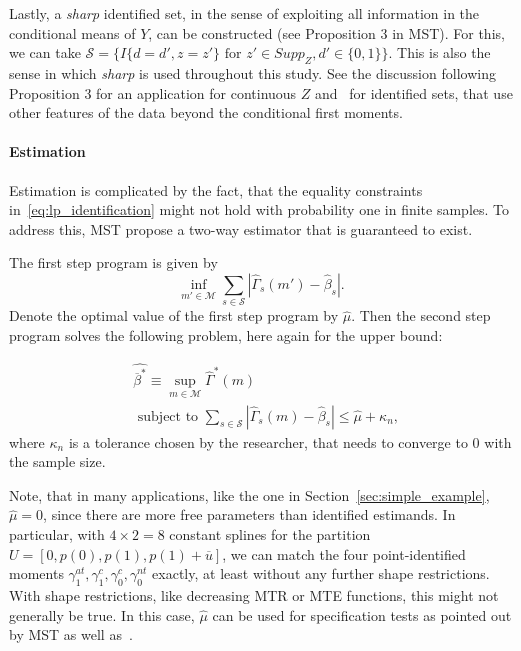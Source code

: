 \documentclass[12pt,a4paper,english]{article} %
\numberwithin{equation}{section}
\theoremstyle{definition}
\theoremstyle{remark}
\theoremstyle{plain}
\begin{document}
Lastly, a \textit{sharp} identified set, in the sense of exploiting all information in the conditional means of $Y$, can be constructed (see Proposition 3 in MST).
For this, we can take $\mathcal{S} = \{I\{d=d', z=z'\} \text{ for } z'\in Supp_Z, d'\in\{0,1\}\}$.
This is also the sense in which \textit{sharp} is used throughout this study.
See the discussion following Proposition 3 for an application for continuous $Z$ and~\cite{marx2024sharp} for identified sets, that use other features of the data beyond the conditional first moments.

\paragraph{Estimation}
Estimation is complicated by the fact, that the equality constraints in~\ref{eq:lp_identification} might not hold with probability one in finite samples.
To address this, MST propose a two-way estimator that is guaranteed to exist.

The first step program is given by
\begin{equation*}\label{eq:lp_estimation_fs}
  \inf_{m'\in \mathcal{M}} \sum_{s\in\mathcal{S}}|\hat{\Gamma}_s(m') - \hat{\beta}_s|.
\end{equation*}
Denote the optimal value of the first step program by $\hat{\mu}$.
Then the second step program solves the following problem, here again for the upper bound:

\begin{align}\label{eq:lp_estimation}
  & \hat{\overline{\beta}^*} \equiv \sup_{m\in \mathcal{M}}\hat{\Gamma}^*(m) \\
  & \text{ subject to } \sum_{s\in\mathcal{S}}|\hat{\Gamma}_s(m) - \hat{\beta}_s| \leq \hat{\mu} + \kappa_n,
\end{align}
where $\kappa_n$ is a tolerance chosen by the researcher, that needs to converge to $0$ with the sample size.

Note, that in many applications, like the one in Section~\ref{sec:simple_example}, $\hat{\mu} = 0$, since there are more free parameters than identified estimands.
In particular, with $4\times2=8$ constant splines for the partition $U = [0, p(0), p(1), p(1) + \overline{u}]$, we can match the four point-identified moments $\gamma_1^{at}, \gamma_1^c, \gamma_0^c, \gamma_0^{nt}$ exactly, at least without any further shape restrictions.
With shape restrictions, like decreasing MTR or MTE functions, this might not generally be true.
In this case, $\hat{\mu}$ can be used for specification tests as pointed out by MST as well as~\cite{shea2023ivmte}.
\end{document}
